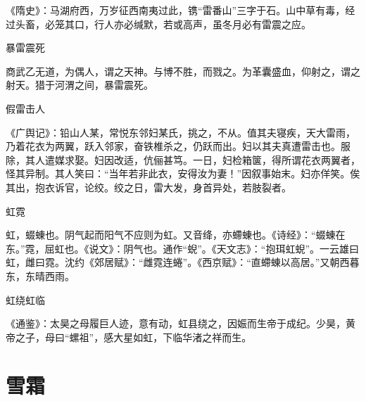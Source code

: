\documentclass[a4paper,12pt,UTF8,twoside]{ctexbook}
\begin{document}
	《隋史》：马湖府西，万岁征西南夷过此，镌“雷番山”三字于石。山中草有毒，经过头畜，必笼其口，行人亦必缄默，若或高声，虽冬月必有雷震之应。
	
	暴雷震死
	
	商武乙无道，为偶人，谓之天神。与博不胜，而戮之。为革囊盛血，仰射之，谓之射天。猎于河渭之间，暴雷震死。
	
	假雷击人
	
	《广舆记》：铅山人某，常悦东邻妇某氏，挑之，不从。值其夫寝疾，天大雷雨，乃着花衣为两翼，跃入邻家，奋铁椎杀之，仍跃而出。妇以其夫真遭雷击也。服除，其人遣媒求娶。妇因改适，伉俪甚笃。一日，妇检箱箧，得所谓花衣两翼者，怪其异制。其人笑曰：“当年若非此衣，安得汝为妻！”因叙事始末。妇亦佯笑。俟其出，抱衣诉官，论绞。绞之日，雷大发，身首异处，若肢裂者。
	
	虹霓
	
	虹，蝃蝀也。阴气起而阳气不应则为虹。又音绛，亦螮蝀也。《诗经》：“蝃蝀在东。”霓，屈虹也。《说文》：阴气也。通作“蜺”。《天文志》：“抱珥虹蜺”。一云雄曰虹，雌曰霓。沈约《郊居赋》：“雌霓连蜷”。《西京赋》：“直螮蝀以高居。”又朝西暮东，东晴西雨。
	
	虹绕虹临
	
	《通鉴》：太昊之母履巨人迹，意有动，虹县绕之，因娠而生帝于成纪。少昊，黄帝之子，母曰“螺祖”，感大星如虹，下临华渚之祥而生。
	
	\chapter{雪霜}
	
\end{document}
